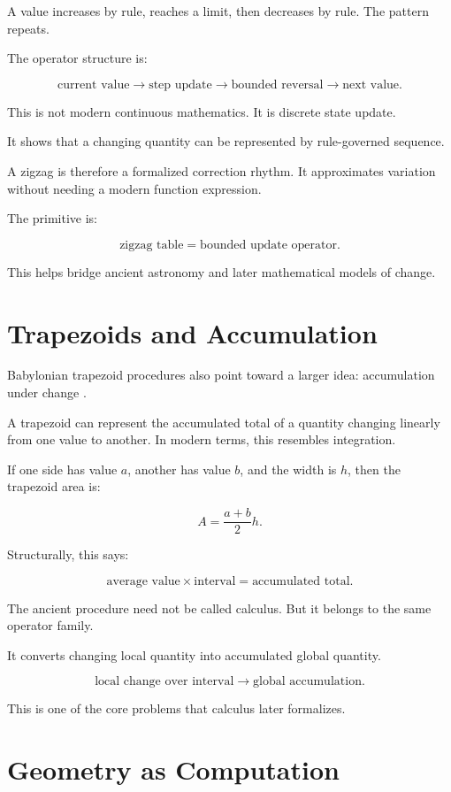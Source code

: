 \documentclass[11pt]{book}
\begin{document}
A value increases by rule, reaches a limit, then decreases by rule. The pattern repeats.

The operator structure is:

\[
\text{current value}
\rightarrow
\text{step update}
\rightarrow
\text{bounded reversal}
\rightarrow
\text{next value}.
\]

This is not modern continuous mathematics. It is discrete state update.

It shows that a changing quantity can be represented by rule-governed sequence.

A zigzag is therefore a formalized correction rhythm. It approximates variation without needing a modern function expression.

The primitive is:

\[
\text{zigzag table} = \text{bounded update operator}.
\]

This helps bridge ancient astronomy and later mathematical models of change.

\section{Trapezoids and Accumulation}

Babylonian trapezoid procedures also point toward a larger idea: accumulation under change \cite{Ossendrijver2016AncientBabylonianAstronomers}.

A trapezoid can represent the accumulated total of a quantity changing linearly from one value to another. In modern terms, this resembles integration.

If one side has value \(a\), another has value \(b\), and the width is \(h\), then the trapezoid area is:

\[
A = \frac{a+b}{2}h.
\]

Structurally, this says:

\[
\text{average value} \times \text{interval} = \text{accumulated total}.
\]

The ancient procedure need not be called calculus. But it belongs to the same operator family.

It converts changing local quantity into accumulated global quantity.

\[
\text{local change over interval}
\rightarrow
\text{global accumulation}.
\]

This is one of the core problems that calculus later formalizes.

\section{Geometry as Computation}
\end{document}
